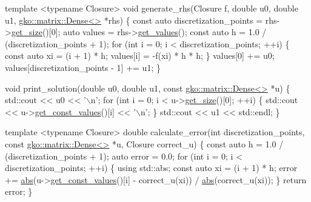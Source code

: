 \begin{DoxyCodeInclude}
\textcolor{keyword}{template} <\textcolor{keyword}{typename} Closure>
\textcolor{keywordtype}{void} generate\_rhs(Closure f, \textcolor{keywordtype}{double} u0, \textcolor{keywordtype}{double} u1, \hyperlink{classgko_1_1matrix_1_1Dense}{gko::matrix::Dense<>} *rhs)
\{
    \textcolor{keyword}{const} \textcolor{keyword}{auto} discretization\_points = rhs->\hyperlink{classgko_1_1LinOp_a31b3c003388eb0b95393154f68c2b98d}{get\_size}()[0];
    \textcolor{keyword}{auto} values = rhs->\hyperlink{classgko_1_1matrix_1_1Dense_a3bc458e02fab8e4c9f60f70bd4d5a4f9}{get\_values}();
    \textcolor{keyword}{const} \textcolor{keyword}{auto} h = 1.0 / (discretization\_points + 1);
    \textcolor{keywordflow}{for} (\textcolor{keywordtype}{int} i = 0; i < discretization\_points; ++i) \{
        \textcolor{keyword}{const} \textcolor{keyword}{auto} xi = (i + 1) * h;
        values[i] = -f(xi) * h * h;
    \}
    values[0] += u0;
    values[discretization\_points - 1] += u1;
\}


\textcolor{keywordtype}{void} print\_solution(\textcolor{keywordtype}{double} u0, \textcolor{keywordtype}{double} u1, \textcolor{keyword}{const} \hyperlink{classgko_1_1matrix_1_1Dense}{gko::matrix::Dense<>} *u)
\{
    std::cout << u0 << \textcolor{charliteral}{'\(\backslash\)n'};
    \textcolor{keywordflow}{for} (\textcolor{keywordtype}{int} i = 0; i < u->\hyperlink{classgko_1_1LinOp_a31b3c003388eb0b95393154f68c2b98d}{get\_size}()[0]; ++i) \{
        std::cout << u->\hyperlink{classgko_1_1matrix_1_1Dense_ab83c739c1b11abaecc3bfd89506f6c9c}{get\_const\_values}()[i] << \textcolor{charliteral}{'\(\backslash\)n'};
    \}
    std::cout << u1 << std::endl;
\}


\textcolor{keyword}{template} <\textcolor{keyword}{typename} Closure>
\textcolor{keywordtype}{double} calculate\_error(\textcolor{keywordtype}{int} discretization\_points, \textcolor{keyword}{const} \hyperlink{classgko_1_1matrix_1_1Dense}{gko::matrix::Dense<>} *u,
                       Closure correct\_u)
\{
    \textcolor{keyword}{const} \textcolor{keyword}{auto} h = 1.0 / (discretization\_points + 1);
    \textcolor{keyword}{auto} error = 0.0;
    \textcolor{keywordflow}{for} (\textcolor{keywordtype}{int} i = 0; i < discretization\_points; ++i) \{
        \textcolor{keyword}{using} std::abs;
        \textcolor{keyword}{const} \textcolor{keyword}{auto} xi = (i + 1) * h;
        error +=
            \hyperlink{namespacegko_a57797fc0a00fd4b7ff34ca4bfc84bc51}{abs}(u->\hyperlink{classgko_1_1matrix_1_1Dense_ab83c739c1b11abaecc3bfd89506f6c9c}{get\_const\_values}()[i] - correct\_u(xi)) / 
      \hyperlink{namespacegko_a57797fc0a00fd4b7ff34ca4bfc84bc51}{abs}(correct\_u(xi));
    \}
    \textcolor{keywordflow}{return} error;
\}



\end{DoxyCodeInclude}
